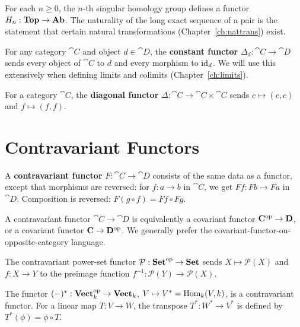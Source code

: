 \begin{example}
For each $n \geq 0$, the $n$-th singular homology group defines a functor $H_n: \mathbf{Top} \to \mathbf{Ab}$. The naturality of the long exact sequence of a pair is the statement that certain natural transformations (Chapter~\ref{ch:nattrans}) exist.
\end{example}

\begin{example}
For any category $\cat{C}$ and object $d \in \cat{D}$, the \textbf{constant functor} $\Delta_d: \cat{C} \to \cat{D}$ sends every object of $\cat{C}$ to $d$ and every morphism to $\mathrm{id}_d$. We will use this extensively when defining limits and colimits (Chapter~\ref{ch:limits}).
\end{example}

\begin{example}
For a category $\cat{C}$, the \textbf{diagonal functor} $\Delta: \cat{C} \to \cat{C} \times \cat{C}$ sends $c \mapsto (c,c)$ and $f \mapsto (f,f)$.
\end{example}

\section{Contravariant Functors}

\begin{definition}
A \textbf{contravariant functor} $F: \cat{C} \to \cat{D}$ consists of the same data as a functor, except that morphisms are reversed: for $f: a \to b$ in $\cat{C}$, we get $Ff: Fb \to Fa$ in $\cat{D}$. Composition is reversed: $F(g \circ f) = Ff \circ Fg$.
\end{definition}

A contravariant functor $\cat{C} \to \cat{D}$ is equivalently a covariant functor $\mathbf{C}^{\mathrm{op}} \to \mathbf{D}$, or a covariant functor $\mathbf{C} \to \mathbf{D}^{\mathrm{op}}$. We generally prefer the covariant-functor-on-opposite-category language.

\begin{example}
The contravariant power-set functor $\mathcal{P}: \mathbf{Set}^{\mathrm{op}} \to \mathbf{Set}$ sends $X \mapsto \mathcal{P}(X)$ and $f: X \to Y$ to the preimage function $f^{-1}: \mathcal{P}(Y) \to \mathcal{P}(X)$.
\end{example}

\begin{example}
The functor $(-)^*: \mathbf{Vect}_k^{\mathrm{op}} \to \mathbf{Vect}_k$, $V \mapsto V^* = \operatorname{Hom}_k(V, k)$, is a contravariant functor. For a linear map $T: V \to W$, the transpose $T^*: W^* \to V^*$ is defined by $T^*(\phi) = \phi \circ T$.
\end{example}

